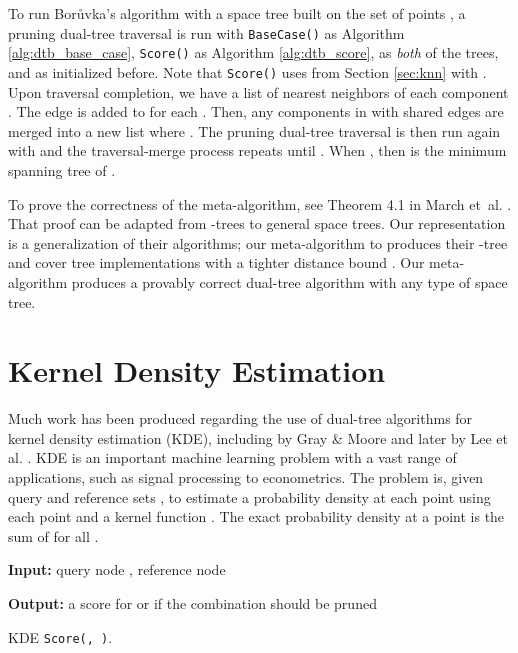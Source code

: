 \documentclass{article}
\begin{document}
\vspace*{-0.4em}
To run Bor\r{u}vka's algorithm with a space tree  built on the
set of points , a pruning dual-tree traversal is run with
\texttt{BaseCase()} as Algorithm \ref{alg:dtb_base_case},
\texttt{Score()} as Algorithm \ref{alg:dtb_score},  as
\textit{both} of the trees, and  as initialized before.  Note that
\texttt{Score()} uses  from Section \ref{sec:knn} with .  Upon traversal completion, we have a list  of nearest neighbors
of each component .  The edge  is added to  for
each .  Then, any components in  with shared edges are merged into a new
list  where .  The pruning dual-tree traversal is then run again
with  and the traversal-merge process repeats until .  When
, then  is the minimum spanning tree of .

\vspace*{-0.4em}
To prove the correctness of the meta-algorithm, see Theorem 4.1 in March et~al.
.  That proof can be adapted from -trees to
general space trees.  Our representation is a generalization of their
algorithms; our meta-algorithm to produces their -tree and cover
tree implementations with a tighter distance bound .  Our
meta-algorithm produces a provably correct dual-tree algorithm with any type of
space tree.











\vspace*{-0.7em}
\section{Kernel Density Estimation}
\label{sec:kde}

\vspace*{-0.3em}
Much work has been produced regarding the use of dual-tree algorithms
for kernel density estimation (KDE), including by Gray \& Moore  and later by Lee et al. .
KDE is an important machine learning problem with a vast range of applications,
such as signal processing to econometrics.  The
problem is, given query and reference sets , to estimate a probability
density  at each point  using each point  and a
kernel function .  The exact probability density at a point  is the
sum of  for all .

\begin{algorithm}[b]
  \begin{algorithmic}
    \STATE \textbf{Input:} query node , reference node

    \STATE \textbf{Output:} a score for  or
 if the combination should be pruned
    \medskip
    \IF{}
      \FORALL{}
        \STATE 
      \ENDFOR
      \RETURN 
    \ENDIF
    \RETURN 
  \end{algorithmic}
  \caption{KDE \texttt{Score(, )}.}
  \label{alg:kde_score}
\end{algorithm}
\end{document}

